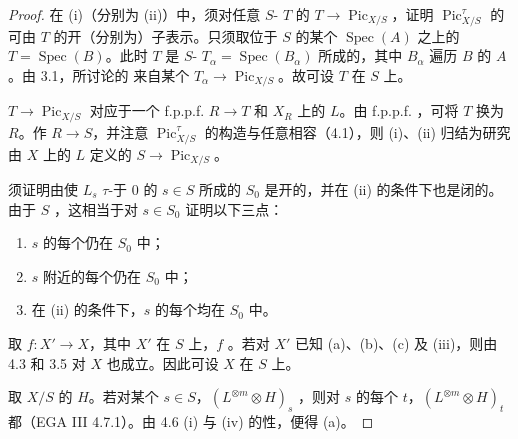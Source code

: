 \begin{proof}
在 (i)（分别为 (ii)）中，须对任意 $S$- $T$ 的 $T\to\operatorname{Pic}_{X/S}$，证明 $\operatorname{Pic}^\tau_{X/S}$ 的可由 $T$ 的开（分别为）子表示。只须取位于 $S$ 的某个 $\operatorname{Spec}(A)$ 之上的 $T=\operatorname{Spec}(B)$。此时 $T$ 是 $S$- $T_\alpha=\operatorname{Spec}(B_\alpha)$ 所成的，其中 $B_\alpha$ 遍历 $B$ 的 $A$ 。由 3.1，所讨论的 来自某个 $T_\alpha\to\operatorname{Pic}_{X/S}$。故可设 $T$ 在 $S$ 上。

 $T\to\operatorname{Pic}_{X/S}$ 对应于一个 f.p.p.f.  $R\to T$ 和 $X_R$ 上的 $L$。由 f.p.p.f. ，可将 $T$ 换为 $R$。作 $R\to S$，并注意 $\operatorname{Pic}^\tau_{X/S}$ 的构造与任意相容（4.1），则 (i)、(ii) 归结为研究由 $X$ 上的 $L$ 定义的 $S\to\operatorname{Pic}_{X/S}$。

须证明由使 $L_s$ $\tau$-于 $0$ 的 $s\in S$ 所成的 $S_0$ 是开的，并在 (ii) 的条件下也是闭的。由于 $S$ ，这相当于对 $s\in S_0$ 证明以下三点：
\begin{enumerate}
\item[(a)] $s$ 的每个仍在 $S_0$ 中；
\item[(b)] $s$ 附近的每个仍在 $S_0$ 中；
\item[(c)] 在 (ii) 的条件下，$s$ 的每个均在 $S_0$ 中。
\end{enumerate}
取  $f:X'\to X$，其中 $X'$ 在 $S$ 上，$f$ 。若对 $X'$ 已知 (a)、(b)、(c) 及 (iii)，则由 4.3 和 3.5 对 $X$ 也成立。因此可设 $X$ 在 $S$ 上。

取 $X/S$ 的 $H$。若对某个 $s\in S$，$(L^{\otimes m}\otimes H)_s$ ，则对 $s$ 的每个 $t$，$(L^{\otimes m}\otimes H)_t$ 都（EGA III 4.7.1）。由 4.6 (i) 与 (iv) 的性，便得 (a)。


\end{proof}

